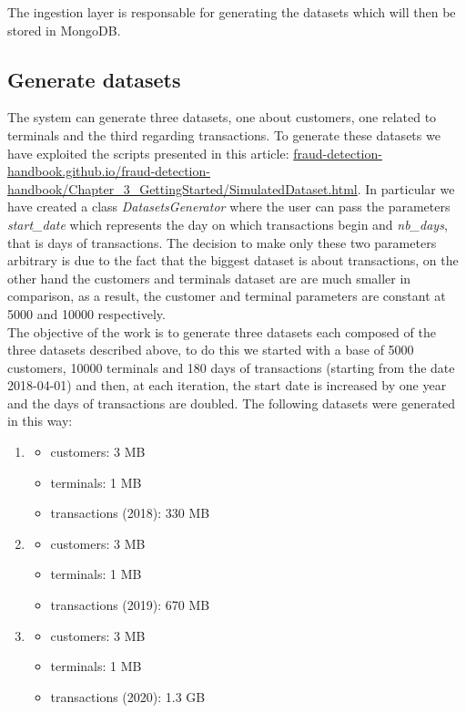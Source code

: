 \documentclass[runningheads]{llncs}
\begin{document}
The ingestion layer is responsable for generating the datasets which will then be stored in MongoDB.

\subsection{Generate datasets}

The system can generate three datasets, one about customers, one related to terminals and the third regarding transactions. To generate these datasets we have exploited the scripts presented in this article: \url{fraud-detection-handbook.github.io/fraud-detection-handbook/Chapter_3_GettingStarted/SimulatedDataset.html}. In particular we have created a class \emph{DatasetsGenerator} where the user can pass the parameters \emph{start\_date} which represents the day on which transactions begin and \emph{nb\_days}, that is days of transactions. The decision to make only these two parameters arbitrary is due to the fact that the biggest dataset is about transactions, on the other hand the customers and terminals dataset are are much smaller in comparison, as a result, the customer and terminal parameters are constant at 5000 and 10000 respectively.
\\
The objective of the work is to generate three datasets each composed of the three datasets described above, to do this we started with a base of 5000 customers, 10000 terminals and 180 days of transactions (starting from the date 2018-04-01) and then, at each iteration, the start date is increased by one year and the days of transactions are doubled. The following datasets were generated in this way:

\begin{enumerate}
    \item \begin{itemize}
        \item customers: 3 MB
        \item terminals: 1 MB
        \item transactions (2018): 330 MB
    \end{itemize}
    \item \begin{itemize}
        \item customers: 3 MB
        \item terminals: 1 MB
        \item transactions (2019): 670 MB
    \end{itemize}
    \item \begin{itemize}
        \item customers: 3 MB
        \item terminals: 1 MB
        \item transactions (2020): 1.3 GB
    \end{itemize}
\end{enumerate}
\end{document}
